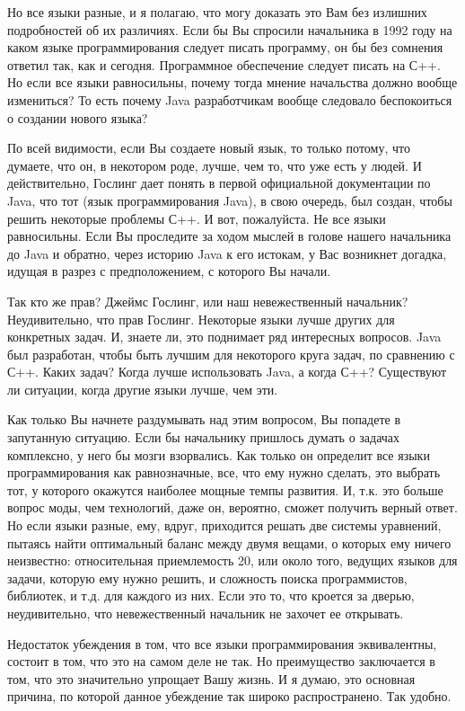 \documentclass[ebook,12pt,oneside,openany]{memoir}
\begin{document}
Но все языки разные, и я полагаю, что могу доказать это Вам без
излишних подробностей об их различиях. Если бы Вы спросили начальника
в 1992 году на каком языке программирования следует писать программу,
он бы без сомнения ответил так, как и сегодня. Программное обеспечение
следует писать на С++. Но если все языки равносильны, почему тогда
мнение начальства должно вообще измениться? То есть почему Java
разработчикам вообще следовало беспокоиться о создании нового языка?

По всей видимости, если Вы создаете новый язык, то только потому, что
думаете, что он, в некотором роде, лучше, чем то, что уже есть у
людей. И действительно, Гослинг дает понять в первой официальной
документации по Java, что тот (язык программирования Java), в свою
очередь, был создан, чтобы решить некоторые проблемы С++. И вот,
пожалуйста. Не все языки равносильны. Если Вы проследите за ходом
мыслей в голове нашего начальника до Java и обратно, через историю
Java к его истокам, у Вас возникнет догадка, идущая в разрез с
предположением, с которого Вы начали.

Так кто же прав? Джеймс Гослинг, или наш невежественный начальник?
Неудивительно, что прав Гослинг. Некоторые языки лучше других для
конкретных задач. И, знаете ли, это поднимает ряд интересных вопросов.
Java был разработан, чтобы быть лучшим для некоторого круга задач, по
сравнению с С++. Каких задач? Когда лучше использовать Java, а когда
С++? Существуют ли ситуации, когда другие языки лучше, чем эти.

Как только Вы начнете раздумывать над этим вопросом, Вы попадете в
запутанную ситуацию. Если бы начальнику пришлось думать о задачах
комплексно, у него бы мозги взорвались. Как только он определит все
языки программирования как равнозначные, все, что ему нужно сделать,
это выбрать тот, у которого окажутся наиболее мощные темпы развития.
И, т.к. это больше вопрос моды, чем технологий, даже он, вероятно,
сможет получить верный ответ. Но если языки разные, ему, вдруг,
приходится решать две системы уравнений, пытаясь найти оптимальный
баланс между двумя вещами, о которых ему ничего неизвестно:
относительная приемлемость 20, или около того, ведущих языков для
задачи, которую ему нужно решить, и сложность поиска программистов,
библиотек, и т.д. для каждого из них. Если это то, что кроется за
дверью, неудивительно, что невежественный начальник не захочет ее
открывать.

Недостаток убеждения в том, что все языки программирования
эквивалентны, состоит в том, что это на самом деле не так. Но
преимущество заключается в том, что это значительно упрощает Вашу
жизнь. И я думаю, это основная причина, по которой данное убеждение
так широко распространено. Так удобно.
\end{document}
